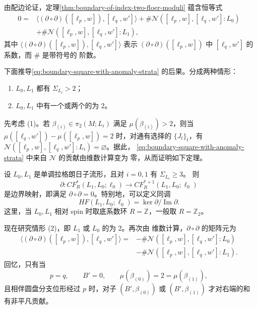 由配边论证，定理\ref{thm:boundary-of-index-two-floer-moduli} 蕴含恒等式
\begin{equation}
\begin{aligned}
0={}&\bigl\langle(\partial\circ\partial)([\ell_p,w]),[\ell_q,w']\bigr\rangle
 +\#\mathcal N([\ell_p,w],[\ell_q,w']:L_0)\\
&+\#\mathcal N([\ell_p,w],[\ell_q,w']:L_1),
\end{aligned}
\label{eq:boundary-square-with-anomaly-strata}
\end{equation}
其中
$\langle(\partial\circ\partial)([\ell_p,w]),[\ell_q,w']\rangle$ 表示
$(\partial\circ\partial)([\ell_p,w])$ 中 $[\ell_q,w']$ 的系数，而 $\#$ 是带符号的
阶数。

下面推导\eqref{eq:boundary-square-with-anomaly-strata} 的后果。分成两种情形：
\begin{enumerate}[label=(\arabic*)]
\item $L_0,L_1$ 都有 $\Sigma_{L_i}>2$；
\item $L_0,L_1$ 中有一个或两个的\termMinimalMaslovNumber{}为 $2$。
\end{enumerate}

先考虑 (1)。若 $\beta_{(i)}\in\pi_2(M;L_i)$ 满足 $\mu(\beta_{(i)})>2$，则当
$\mu([\ell_q,w'])-\mu([\ell_p,w])=2$ 时，对通有选择的 $\{J_t\}_t$，有
$\mathcal N([\ell_p,w],[\ell_q,w']:L_i)=\varnothing$。据此，
\eqref{eq:boundary-square-with-anomaly-strata} 中来自 $\mathcal N$ 的贡献由维数计算变为
零，从而证明如下定理。

\begin{theorem}
\label{thm:minimal-maslov-at-least-three-floer-homology}
设 $L_0,L_1$ 是单调拉格朗日子流形，且对 $i=0,1$ 有 $\Sigma_{L_i}\geq3$。
则\personFloer{} \termPreBoundaryMap{}
\[
 \partial:CF_R^*(L_1,L_0;\ell_0)\longrightarrow CF_R^{*+1}(L_1,L_0;\ell_0)
\]
是边界映射，即满足 $\partial\circ\partial=0$。特别地，可以定义\personFloer{}同调
\[
 HF(L_1,L_0;\ell_0)=\ker\partial/\operatorname{Im}\partial.
\]
这里，当 $L_0,L_1$ 相对 spin 时取底系数环 $R=\mathbb Z$，一般取
$R=\mathbb Z_2$。
\end{theorem}

现在研究情形 (2)，即 $L_1$ 或 $L_0$ 的\termMinimalMaslovNumber{}为 $2$。再次由
维数计算，$\partial\circ\partial$ 的矩阵元为
\[
\begin{aligned}
 \bigl\langle(\partial\circ\partial)([\ell_p,w]),[\ell_q,w']\bigr\rangle
 ={}&-\#\mathcal N([\ell_p,w],[\ell_q,w']:L_0)\\
 &-\#\mathcal N([\ell_p,w],[\ell_q,w']:L_1).
\end{aligned}
\]
回忆，只有当
\[
 p=q,\qquad B'=0,\qquad
 \mu(\beta_{(0)})=2=\mu(\beta_{(1)}),
\]
且相伴圆盘分支位形经过 $p$ 时，对子 $(B',\beta_{(0)})$ 或
$(B',\beta_{(1)})$ 才对右端的和有非平凡贡献。

